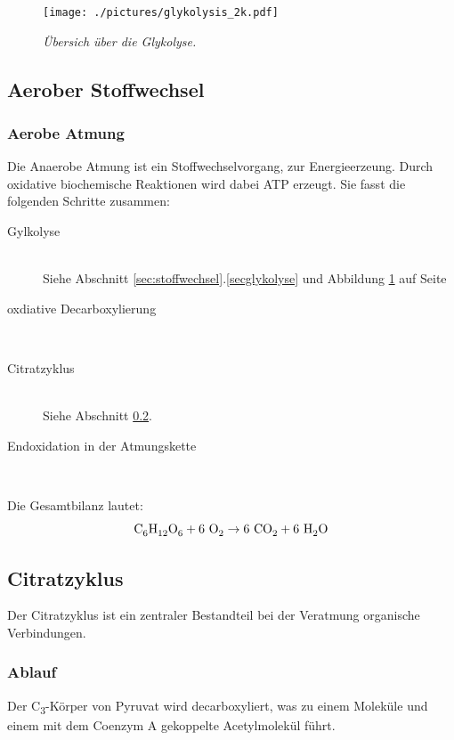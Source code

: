 \begin{figure}[htb!]
	\leavevmode
	\begin{center}
		\texttt{[image: ./pictures/glykolysis\_2k.pdf]}
	\end{center}
	\caption{\slshape{Übersich über die Glykolyse.}}
	\label{fig:glykolyse}
\end{figure}

\subsection{Aerober Stoffwechsel}

\subsubsection*{Aerobe Atmung}
Die Anaerobe Atmung ist ein Stoffwechselvorgang,
zur Energieerzeung.
Durch oxidative biochemische Reaktionen wird dabei ATP erzeugt.
Sie fasst die folgenden Schritte zusammen:

\begin{description}
	\item[Gylkolyse]	\hfill	\\
		Siehe Abschnitt \ref{sec:stoffwechsel}.\ref{secglykolyse} 
		und Abbildung \ref{fig:glykolyse} auf Seite \pageref{fig:glykolyse}
	\item[oxdiative Decarboxylierung]	\hfill	\\
	\item[Citratzyklus]	\hfill	\\
		Siehe Abschnitt \ref{sec:citratzyklus}.
	\item[Endoxidation in der Atmungskette]	\hfill	\\
\end{description}

Die Gesamtbilanz lautet:
\begin{equation}
	\ce{C6H12O6} + 6\ \ce{O2} \rightarrow 6\ \ce{CO2} + 6\ \ce{H2O}
	\label{eq:aerobeAtmung}
\end{equation}

\subsection{Citratzyklus}
\label{sec:citratzyklus}

Der Citratzyklus ist ein zentraler Bestandteil bei der Veratmung organische Verbindungen.

\subsubsection*{Ablauf}
Der C\textsubscript{3}-Körper von Pyruvat wird decarboxyliert,
was zu einem Moleküle  
und einem mit dem Coenzym A gekoppelte Acetylmolekül führt.

